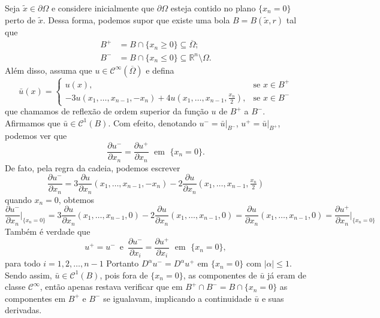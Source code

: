 \documentclass[a4paper, 11pt]{book}
\theoremstyle{definition}
\newcommand{\bR}{\mathbb{R}}
\newcommand{\cC}{\mathcal{C}}
\begin{document}
\begin{prf}
    Seja $\tilde x \in \partial\Omega$ e considere inicialmente que $\partial\Omega$ esteja contido no plano $\{x_n = 0\}$ perto de $\tilde x$.
    Dessa forma, podemos supor que existe uma bola $B = B(\tilde x, r)$ tal que
    \begin{equation} \label{eq:reflexao}
        \begin{aligned}
            B^+ &= B \cap \{x_n \geqslant 0\} \subseteq \overline\Omega;\\
            B^- &= B \cap \{x_n \leqslant 0\} \subseteq \bR^n \setminus \Omega.
        \end{aligned}
    \end{equation}
    Além disso, assuma que $u \in \cC^\infty(\overline\Omega)$ e defina
    \[
        \bar u(x) =
        \left\{ 
            \begin{array}{ll}
                u(x), & \text{se } x\in B^+\\
                -3u(x_1,\dots,x_{n-1}, -x_n) + 4u(x_1,\dots,x_{n-1},\frac{x_n}{2}), & \text{se } x \in B^-
            \end{array}
        \right.
    \]
    que chamamos de reflexão de ordem superior da função $u$ de $B^+$ a $B^-$.
    Afirmamos que $\bar u \in \cC^1(B)$.
    Com efeito, denotando $u^- = \bar u \big|_{B^-}$, $u^+ = \bar u \big|_{B^+}$, podemos ver que
    \[
        \dfrac{\partial u^-}{\partial x_n} = \dfrac{\partial u^+}{\partial x_n} \;\text{ em }\; \{x_n = 0\}.
    \]
    De fato, pela regra da cadeia, podemos escrever
    \[
        \dfrac{\partial u^-}{\partial x_n} = 3 \frac{\partial u}{\partial x_n}(x_1,\dots,x_{n-1}, -x_n)  - 2\frac{\partial u}{\partial x_n}(x_1,\dots,x_{n-1},\tfrac{x_n}{2})
    \]
    quando $x_n = 0$, obtemos
    \[
        \dfrac{\partial u^-}{\partial x_n} \Bigg|_{\{x_n = 0\}} = 3\frac{\partial u}{\partial x_n}(x_1,\dots,x_{n-1},0) - 2\frac{\partial u}{\partial x_n}(x_1,\dots,x_{n-1},0) = \frac{\partial u}{\partial x_n}(x_1,\dots,x_{n-1},0) = \dfrac{\partial u^+}{\partial x_n} \Bigg|_{\{x_n =0\}}
    \]
    Também é verdade que
    \[
        u^+ = u^- \,\text{ e }\, \dfrac{\partial u^-}{\partial x_i} = \dfrac{\partial u^+}{\partial x_i}  \;\text{ em }\; \{x_n = 0\},
    \]
    para todo $i = 1,2,\dots,n-1$ Portanto $D^\alpha u^- = D^\alpha u^+$ em $\{x_n = 0\}$ com $|\alpha| \leqslant 1$. Sendo assim, $\bar u \in \cC^1 (B)$, pois fora de $\{x_n = 0\}$, as componentes de $\bar u$ já eram de classe $\cC^\infty$, então apenas restava verificar que em $B^+ \cap B^- = B \cap \{x_n = 0\}$ as componentes em $B^+$ e $B^-$ se igualavam, implicando a continuidade $\bar u$ e suas derivadas.


\end{prf}
\end{document}
